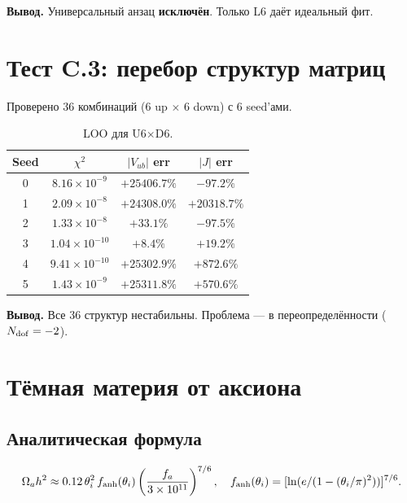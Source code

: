 \documentclass[12pt,a4paper]{article}
\numberwithin{equation}{section}
\begin{document}
\textbf{Вывод.} Универсальный анзац \textbf{исключён}.
Только L6 даёт идеальный фит.

\section{Тест C.3: перебор структур матриц}

Проверено 36 комбинаций (6 up $\times$ 6 down) с 6 seed'ами.

\begin{table}[H]
\centering
\caption{LOO для U6$\times$D6.}
\begin{tabular}{cccc}
\toprule
Seed & $\chi^2$ & $|V_{ub}|$ err & $|J|$ err \\
\midrule
0 & $8.16\times10^{-9}$ & $+25406.7\%$ & $-97.2\%$ \\
1 & $2.09\times10^{-8}$ & $+24308.0\%$ & $+20318.7\%$ \\
2 & $1.33\times10^{-8}$ & $+33.1\%$    & $-97.5\%$ \\
3 & $1.04\times10^{-10}$ & $+8.4\%$    & $+19.2\%$ \\
4 & $9.41\times10^{-10}$ & $+25302.9\%$ & $+872.6\%$ \\
5 & $1.43\times10^{-9}$ & $+25311.8\%$ & $+570.6\%$ \\
\bottomrule
\end{tabular}
\end{table}

\textbf{Вывод.} Все 36 структур нестабильны. Проблема --- в
переопределённости ($N_{\rm dof} = -2$).

\section{Тёмная материя от аксиона}
\label{sec:dm}

\subsection{Аналитическая формула}

\begin{equation}
\Omega_a h^2 \approx 0.12\,\theta_i^2\, f_{\rm anh}(\theta_i)
\left(\frac{f_a}{3\times10^{11}}\right)^{7/6},
\quad f_{\rm anh}(\theta_i) = [\ln(e/(1-(\theta_i/\pi)^2))]^{7/6}.
\end{equation}
\end{document}
